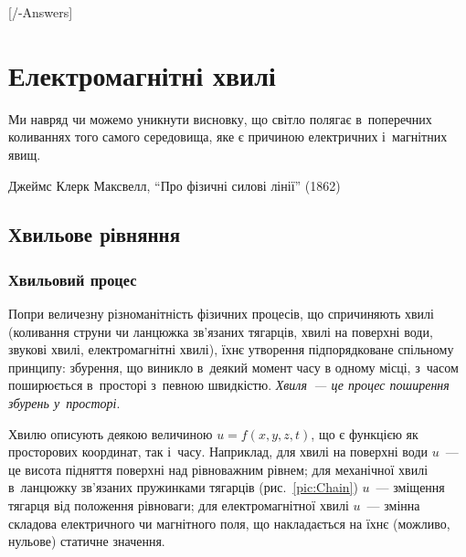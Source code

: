 
[\currfilebase/\currfilebase-Answers]
\chapter{Електромагнітні хвилі}\label{\currfilebase}\hypertarget{\currfilebase}{}
\graphicspath{{\currfilebase/Pictures}}
\epigraph{\Alexander Ми навряд чи можемо уникнути висновку, що світло полягає в~поперечних коливаннях того самого
	середовища, яке є причиною електричних і~магнітних явищ.}{Джеймс Клерк Максвелл, \enquote{Про фізичні силові лінії} (1862)}

\section{Хвильове рівняння}\hypertarget{wave-equation}{}

\subsection*{Хвильовий процес}

Попри величезну різноманітність фізичних процесів, що спричиняють хвилі (коливання струни чи ланцюжка зв'язаних тягарців, хвилі на поверхні
води, звукові хвилі, електромагнітні хвилі), їхнє утворення підпорядковане спільному принципу: збурення, що виникло в~деякий момент часу в
одному місці, з~часом поширюється в~просторі з~певною швидкістю. \emph{Хвиля~--- це процес поширення збурень у~просторі}.

Хвилю описують деякою величиною $u = f(x,y,z,t)$, що є функцією як просторових координат, так і~часу. Наприклад, для хвилі на поверхні води $u$~--- це висота підняття поверхні над рівноважним рівнем; для механічної хвилі в~ланцюжку зв'язаних пружинками тягарців (рис.~\ref{pic:Chain}) $u$~--- зміщення тягарця від положення рівноваги; для електромагнітної хвилі $u$~--- змінна складова електричного чи магнітного поля, що
накладається на їхнє (можливо, нульове) статичне значення.

